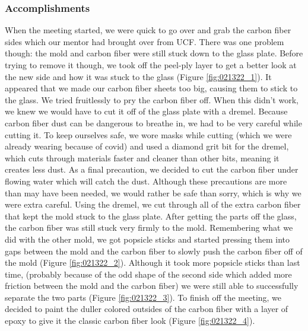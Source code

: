\subsubsection*{Accomplishments}
When the meeting started, we were quick to go over and grab the carbon fiber sides which our mentor had brought over from UCF. There was one problem though: the mold and carbon fiber were still stuck down to the glass plate. Before trying to remove it though, we took off the peel-ply layer to get a better look at the new side and how it was stuck to the glass (Figure \ref{fig:021322_1}). It appeared that we made our carbon fiber sheets too big, causing them to stick to the glass. We tried fruitlessly to pry the carbon fiber off. When this didn’t work, we knew we would have to cut it off of the glass plate with a dremel. Because carbon fiber dust can be dangerous to breathe in, we had to be very careful while cutting it. To keep ourselves safe, we wore masks while cutting (which we were already wearing because of covid) and used a diamond grit bit for the dremel, which cuts through materials faster and cleaner than other bits, meaning it creates less dust. As a final precaution, we decided to cut the carbon fiber under flowing water which will catch the dust. Although these precautions are more than may have been needed, we would rather be safe than sorry, which is why we were extra careful. Using the dremel, we cut through all of the extra carbon fiber that kept the mold stuck to the glass plate. After getting the parts off the glass, the carbon fiber was still stuck very firmly to the mold. Remembering what we did with the other mold, we got popsicle sticks and started pressing them into gaps between the mold and the carbon fiber to slowly push the carbon fiber off of the mold (Figure \ref{fig:021322_2}). Although it took more popsicle sticks than last time, (probably because of the odd shape of the second side which added more friction between the mold and the carbon fiber) we were still able to successfully separate the two parts (Figure \ref{fig:021322_3}). To finish off the meeting, we decided to paint the duller colored outsides of the carbon fiber with a layer of epoxy to give it the classic carbon fiber look (Figure \ref{fig:021322_4}). 

